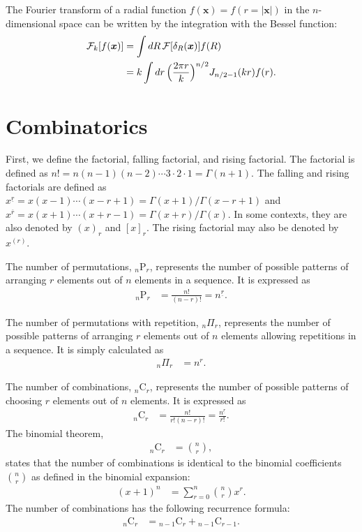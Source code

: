 \documentclass[amsmath,amssymb,prc,aps]{revtex4-2}
\begin{document}
The Fourier transform of a radial function $f(\bm{x}) = f(r = |\bm{x}|)$ in the
$n$-dimensional space can be written by the integration with the Bessel
function:
\begin{align}
  \mathcal{F}_k[f(\bm{x})]
  &= \int dR\, \mathcal{F}[\delta_R(\bm{x})] f(R) \notag \\
  &= k\int dr\, \Bigl(\frac{2\pi r}{k}\Bigr)^{n/2} J_{n/2-1}(kr) f(r).
\end{align}

\section{Combinatorics}
First, we define the factorial, falling factorial, and rising factorial.  The
factorial is defined as $n! = n(n-1)(n-2)\cdots3\cdot 2\cdot 1 = \Gamma(n+1)$.
The falling and rising factorials are defined as $x^{\underline{r}} =
x(x-1)\cdots (x-r+1) = \Gamma(x+1)/\Gamma(x-r+1)$ and $x^{\overline{r}} =
x(x+1)\cdots (x+r-1) = \Gamma(x+r)/\Gamma(x)$.  In some contexts, they are also
denoted by $(x)_r$ and $[x]_r$.  The rising factorial may also be denoted by
$x^{(r)}$.

The number of permutations, $_n\mathrm{P}_r$, represents the number of possible
patterns of arranging $r$ elements out of $n$ elements in a sequence.  It is
expressed as
\begin{align}
  {}_n\mathrm{P}_r &= \frac{n!}{(n-r)!} = n^{\underline{r}}.
\end{align}

The number of permutations with repetition, $_n\Pi_r$, represents the number of
possible patterns of arranging $r$ elements out of $n$ elements allowing
repetitions in a sequence. It is simply calculated as
\begin{align}
  {}_n\Pi_r &= n^r.
\end{align}

The number of combinations, $_n\mathrm{C}_r$, represents the number of possible
patterns of choosing $r$ elements out of $n$ elements.  It is expressed as
\begin{align}
  {}_n\mathrm{C}_r &= \frac{n!}{r!(n-r)!} = \frac{n^{\underline{r}}}{r!}.
\end{align}
The binomial theorem,
\begin{align}
  {}_n\mathrm{C}_r &= \binom{n}{r},
\end{align}
states that the number
of combinations is identical to the binomial coefficients $\binom{n}{r}$ as
defined in the binomial expansion:
\begin{align}
  (x+1)^n &= \sum_{r=0}^n \binom{n}{r} x^r.
\end{align}
The number of combinations has the following recurrence formula:
\begin{align}
  {}_n\mathrm{C}_r &= {}_{n-1}\mathrm{C}_r + {}_{n-1}\mathrm{C}_{r-1}.
\end{align}
\end{document}
